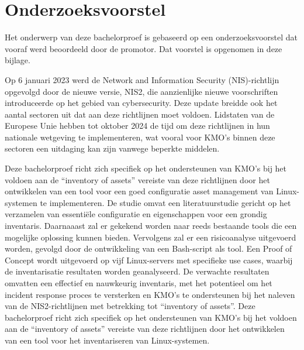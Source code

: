 \documentclass[dutch,dit,thesis]{hogentreport}
\begin{document}








%
%




\appendix

\chapter{Onderzoeksvoorstel}

Het onderwerp van deze bachelorproef is gebaseerd op een onderzoeksvoorstel dat vooraf werd beoordeeld door de promotor. Dat voorstel is opgenomen in deze bijlage.

Op 6 januari 2023 werd de Network and Information Security (NIS)-richtlijn opgevolgd door de nieuwe versie, NIS2, die aanzienlijke nieuwe voorschriften introduceerde op het gebied van cybersecurity.
Deze update breidde ook het aantal sectoren uit dat aan deze richtlijnen moet voldoen.
Lidstaten van de Europese Unie hebben tot oktober 2024 de tijd om deze richtlijnen in hun nationale wetgeving te implementeren, wat vooral voor KMO's binnen deze sectoren een uitdaging kan zijn vanwege beperkte middelen.

Deze bachelorproef richt zich specifiek op het ondersteunen van KMO's bij het voldoen aan de ``inventory of assets'' vereiste van deze richtlijnen door het ontwikkelen van een tool voor een goed configuratie asset management van Linux-systemen te implementeren.
De studie omvat een literatuurstudie gericht op het verzamelen van essenti\"ele configuratie en eigenschappen voor een grondig inventaris. Daarnaaast zal er gekekend worden naar reeds bestaande tools die een mogelijke oplossing kunnen bieden.
Vervolgens zal er een risicoanalyse uitgevoerd worden, gevolgd door de ontwikkeling van een Bash-script als tool.
Een Proof of Concept wordt uitgevoerd op vijf Linux-servers met specifieke use cases, waarbij de inventarisatie resultaten worden geanalyseerd.
De verwachte resultaten omvatten een effectief en nauwkeurig inventaris, met het potentieel om het incident response proces te versterken en KMO's te ondersteunen bij het naleven van de NIS2-richtlijnen met betrekking tot ``inventory of assets''.
Deze bachelorproef richt zich specifiek op het ondersteunen van KMO's bij het voldoen aan de ``inventory of assets'' vereiste van deze richtlijnen door het ontwikkelen van een tool voor het inventariseren van Linux-systemen.
\end{document}
